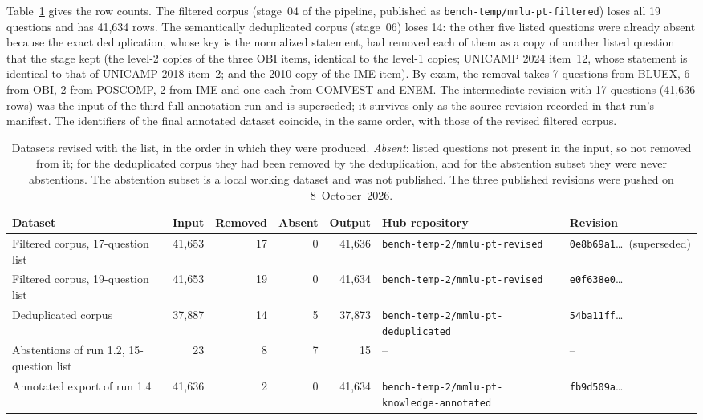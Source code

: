 Table~\ref{tab:rev-datasets} gives the row counts. The filtered corpus
(stage~04 of the pipeline, published as \texttt{bench-temp/mmlu-pt-filtered})
loses all 19 questions and has 41,634 rows. The semantically deduplicated
corpus (stage~06) loses 14: the other five listed questions were already
absent because the exact deduplication, whose key is the normalized
statement, had removed each of them as a copy of another listed question that
the stage kept (the level-2 copies of the three OBI items, identical to the
level-1 copies; UNICAMP 2024 item~12, whose statement is identical to that of
UNICAMP 2018 item~2; and the 2010 copy of the IME item). By exam,
the removal takes 7 questions from BLUEX, 6 from OBI, 2 from POSCOMP, 2 from
IME and one each from COMVEST and ENEM. The intermediate revision with 17
questions (41,636 rows) was the input of the third full annotation run and is
superseded; it survives only as the source revision recorded in that run's
manifest. The identifiers of the final annotated dataset coincide, in the
same order, with those of the revised filtered corpus.

\begin{table}[t]
\centering
\footnotesize
\setlength{\tabcolsep}{4pt}
\begin{tabular}{@{}lrrrrll@{}}
\toprule
Dataset & Input & Removed & Absent & Output & Hub repository & Revision \\
\midrule
Filtered corpus, 17-question list & 41,653 & 17 & 0 & 41,636 & \texttt{bench-temp-2/mmlu-pt-revised} & \texttt{0e8b69a1}\ldots\ (superseded) \\
Filtered corpus, 19-question list & 41,653 & 19 & 0 & 41,634 & \texttt{bench-temp-2/mmlu-pt-revised} & \texttt{e0f638e0}\ldots \\
Deduplicated corpus & 37,887 & 14 & 5 & 37,873 & \texttt{bench-temp-2/mmlu-pt-deduplicated} & \texttt{54ba11ff}\ldots \\
Abstentions of run 1.2, 15-question list & 23 & 8 & 7 & 15 & -- & -- \\
Annotated export of run 1.4 & 41,636 & 2 & 0 & 41,634 & \texttt{bench-temp-2/mmlu-pt-knowledge-annotated} & \texttt{fb9d509a}\ldots \\
\bottomrule
\end{tabular}
\caption{Datasets revised with the list, in the order in which they were produced. \emph{Absent}: listed questions not present in the input, so not removed from it; for the deduplicated corpus they had been removed by the deduplication, and for the abstention subset they were never abstentions. The abstention subset is a local working dataset and was not published. The three published revisions were pushed on 8~October~2026.}
\label{tab:rev-datasets}
\end{table}

